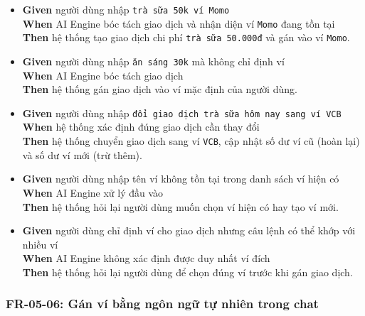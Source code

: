 \begin{itemize}
\item \textbf{Given} người dùng nhập \texttt{trà sữa 50k ví Momo}  \\ \hspace*{1.5em}  \textbf{When} AI Engine bóc tách giao dịch và nhận diện ví \texttt{Momo} đang tồn tại  \\ \hspace*{1.5em}  \textbf{Then} hệ thống tạo giao dịch chi phí \texttt{trà sữa 50.000đ} và gán vào ví \texttt{Momo}.
\item \textbf{Given} người dùng nhập \texttt{ăn sáng 30k} mà không chỉ định ví  \\ \hspace*{1.5em}  \textbf{When} AI Engine bóc tách giao dịch  \\ \hspace*{1.5em}  \textbf{Then} hệ thống gán giao dịch vào ví mặc định của người dùng.
\item \textbf{Given} người dùng nhập \texttt{đổi giao dịch trà sữa hôm nay sang ví VCB}  \\ \hspace*{1.5em}  \textbf{When} hệ thống xác định đúng giao dịch cần thay đổi  \\ \hspace*{1.5em}  \textbf{Then} hệ thống chuyển giao dịch sang ví \texttt{VCB}, cập nhật số dư ví cũ (hoàn lại) và số dư ví mới (trừ thêm).
\item \textbf{Given} người dùng nhập tên ví không tồn tại trong danh sách ví hiện có  \\ \hspace*{1.5em}  \textbf{When} AI Engine xử lý đầu vào  \\ \hspace*{1.5em}  \textbf{Then} hệ thống hỏi lại người dùng muốn chọn ví hiện có hay tạo ví mới.
\item \textbf{Given} người dùng chỉ định ví cho giao dịch nhưng câu lệnh có thể khớp với nhiều ví  \\ \hspace*{1.5em}  \textbf{When} AI Engine không xác định được duy nhất ví đích  \\ \hspace*{1.5em}  \textbf{Then} hệ thống hỏi lại người dùng để chọn đúng ví trước khi gán giao dịch.
\end{itemize}
\subsubsection{FR-05-06: Gán ví bằng ngôn ngữ tự nhiên trong chat}


